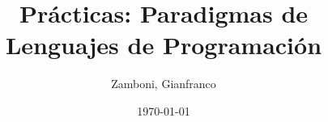 \documentclass[10pt,a4paper]{article}
\begin{document}
\title{Prácticas: Paradigmas de Lenguajes de Programación}

\date{\today}

\author{Zamboni, Gianfranco}

\maketitle
\tableofcontents

\newpage
\setcounter{page}{1}


\newpage

\end{document}
